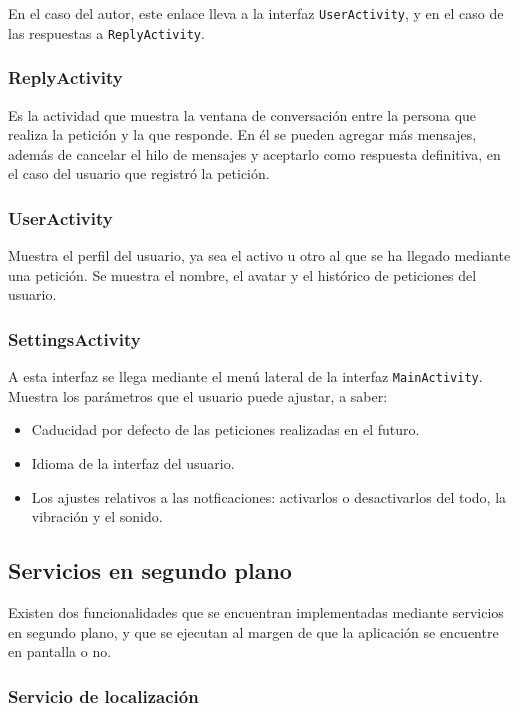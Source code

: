 \documentclass[main]{subfiles}
\begin{document}
En el caso del autor, este enlace lleva a la interfaz \texttt{UserActivity}, y en el caso de las respuestas a \texttt{ReplyActivity}.

\subsubsection{ReplyActivity}

Es la actividad que muestra la ventana de conversación entre la persona que realiza la petición y la que responde. En él se pueden agregar más mensajes, además de cancelar el hilo de mensajes y aceptarlo como respuesta definitiva, en el caso del usuario que registró la petición.

\subsubsection{UserActivity}

Muestra el perfil del usuario, ya sea el activo u otro al que se ha llegado mediante una petición. Se muestra el nombre, el avatar y el histórico de peticiones del usuario.

\subsubsection{SettingsActivity}

A esta interfaz se llega mediante el menú lateral de la interfaz \texttt{MainActivity}. Muestra los parámetros que el usuario puede ajustar, a saber:

\begin{itemize}
  \item Caducidad por defecto de las peticiones realizadas en el futuro.
  \item Idioma de la interfaz del usuario.
  \item Los ajustes relativos a las notficaciones: activarlos o desactivarlos del todo, la vibración y el sonido.
\end{itemize}

\subsection{Servicios en segundo plano}

Existen dos funcionalidades que se encuentran implementadas mediante servicios en segundo plano, y que se ejecutan al margen de que la aplicación se encuentre en pantalla o no.

\subsubsection{Servicio de localización}
\end{document}
